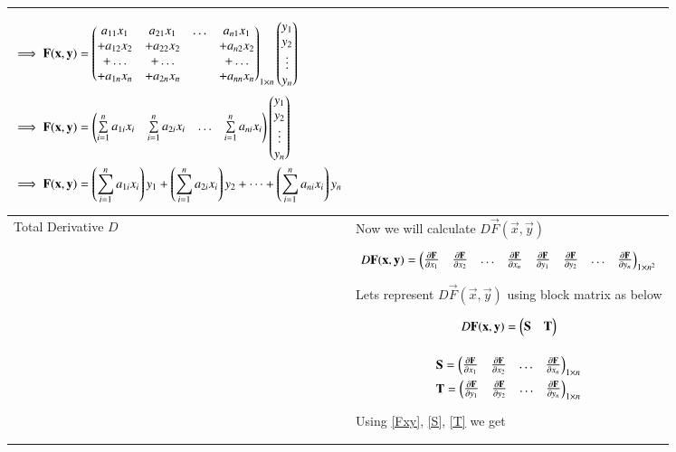 \documentclass[journal,12pt]{IEEEtran}
\begin{document}
\begin{longtable}{|l|l|}
{\begin{align}
    \implies\mathbf{F}(\mathbf{x},\mathbf{y})&=\begin{pmatrix}a_{11}x_1&a_{21}x_1&\dots &a_{n1}x_1\\+a_{12}x_2&+a_{22}x_2&\quad&+a_{n2}x_2\\+\dots&+\dots&\quad&+\dots\\+a_{1n}x_n&+a_{2n}x_n&\quad&+a_{nn}x_n\end{pmatrix}_{1\times n}\begin{pmatrix}y_1\\y_2\\\vdots\\y_n\end{pmatrix}\\
    \implies\mathbf{F}(\mathbf{x},\mathbf{y})&=\begin{pmatrix}\sum\limits_{i=1}^na_{1i}x_i&\sum\limits_{i=1}^na_{2i}x_i&\dots&\sum\limits_{i=1}^na_{ni}x_i\end{pmatrix}\begin{pmatrix}y_1\\y_2\\\vdots\\y_n\end{pmatrix}\\
    \implies\mathbf{F}(\mathbf{x},\mathbf{y})&=\left(\sum\limits_{i=1}^na_{1i}x_i\right)y_1+\left(\sum\limits_{i=1}^na_{2i}x_i\right)y_2+\dots+\left(\sum\limits_{i=1}^na_{ni}x_i\right)y_n\label{Fxy}
\end{align}}\\
\hline
Total Derivative $D$&Now we will calculate $D\vec{F}(\vec{x},\vec{y})$\\&\parbox{13cm}{\begin{align}
    D\mathbf{F}(\mathbf{x},\mathbf{y})=\begin{pmatrix}\frac{\partial \mathbf{F}}{\partial x_1}&\frac{\partial \mathbf{F}}{\partial x_2}&\dots&\frac{\partial \mathbf{F}}{\partial x_n}&\frac{\partial \mathbf{F}}{\partial y_1}&\frac{\partial \mathbf{F}}{\partial y_2}&\dots&\frac{\partial \mathbf{F}}{\partial y_n}\end{pmatrix}_{1\times n^2}\label{D}
\end{align}}\\&Lets represent $D\vec{F}(\vec{x},\vec{y})$ using block matrix as below\\&\parbox{13cm}{\begin{align}
    D\mathbf{F}(\mathbf{x},\mathbf{y})=\begin{pmatrix}\mathbf{S}&\mathbf{T}\end{pmatrix}\label{Dst}
\end{align}}\\&\parbox{13cm}{\begin{align}
    \mathbf{S}=\begin{pmatrix}\frac{\partial \mathbf{F}}{\partial x_1}&\frac{\partial \mathbf{F}}{\partial x_2}&\dots&\frac{\partial \mathbf{F}}{\partial x_n}\end{pmatrix}_{1\times n}\label{S}\\
    \mathbf{T}=\begin{pmatrix}\frac{\partial \mathbf{F}}{\partial y_1}&\frac{\partial \mathbf{F}}{\partial y_2}&\dots&\frac{\partial \mathbf{F}}{\partial y_n}\end{pmatrix}_{1\times n}\label{T}
\end{align}}\\&Using \eqref{Fxy}, \eqref{S}, \eqref{T} we get\\&\parbox{13cm}{\begin{align}

\end{align}}
\end{longtable}
\end{document}

